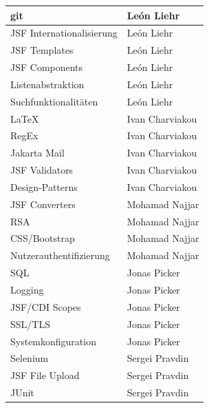 \documentclass{article}
\begin{document}
\begin{table}[H]
\centering
\hypertarget{speziell}{}
\begin{tabular}{| p{6cm} | p{6cm} |}
	\hline
     	git & León Liehr \\
     	\hline
     	JSF Internationalisierung & León Liehr \\
     	\hline
    	JSF Templates & León Liehr \\
     	\hline
     	JSF Components & León Liehr \\
     	\hline
     	Listenabstraktion & León Liehr \\
     	\hline
     	Suchfunktionalitäten & León Liehr \\
     	\hline
     	\hline
     	LaTeX & Ivan Charviakou \\
     	\hline
     	RegEx & Ivan Charviakou \\
     	\hline
     	Jakarta Mail & Ivan Charviakou \\
     	\hline
     	JSF Validators & Ivan Charviakou \\
     	\hline
     	Design-Patterns & Ivan Charviakou \\
     	\hline
     	\hline
     	JSF Converters & Mohamad Najjar \\
    	\hline
    	 RSA & Mohamad Najjar \\
    	\hline
    	 CSS/Bootstrap & Mohamad Najjar \\
     	\hline
     	Nutzerauthentifizierung & Mohamad Najjar \\
     	\hline
     	\hline
     	SQL & Jonas Picker \\
    	\hline
    	Logging & Jonas Picker \\
     	\hline
     	JSF/CDI Scopes & Jonas Picker \\
     	\hline
     	SSL/TLS & Jonas Picker \\
     	\hline
     	Systemkonfiguration & Jonas Picker \\
     	\hline
     	\hline
     	Selenium & Sergei Pravdin \\
     	\hline
     	JSF File Upload & Sergei Pravdin \\
     	\hline
     	JUnit & Sergei Pravdin \\
     	\hline
     	
\end{tabular}
\end{table}
\newpage
\end{document}
